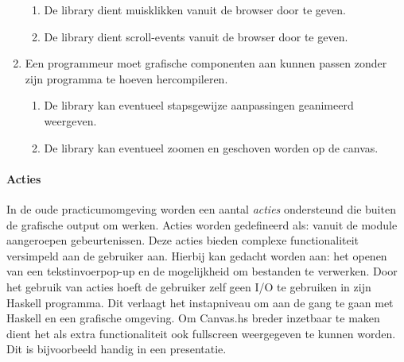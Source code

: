 \begin{enumerate}[label={R\arabic*}]
\begin{enumerate}[label={R\arabic{enumi}.\arabic*}]
		\item \label{req:event:mouse} De library dient muisklikken vanuit de browser door te geven.
		\item \label{req:event:scroll} De library dient scroll-events vanuit de browser door te geven.
	\end{enumerate}
	\item Een programmeur moet grafische componenten aan kunnen passen zonder zijn programma te hoeven hercompileren.
	\begin{enumerate}[label={R\arabic{enumi}.\arabic*}]
		\item \label{req:action:animate} De library kan eventueel stapsgewijze aanpassingen geanimeerd weergeven.
		\item \label{req:zoom} De library kan eventueel zoomen en geschoven worden op de canvas.
	\end{enumerate}
	\setcounter{startvalue}{\value{enumi}}
\end{enumerate}

\paragraph{Acties} In de oude practicumomgeving worden een aantal \emph{acties} ondersteund die buiten de grafische output om werken. Acties worden gedefineerd als: vanuit de module aangeroepen gebeurtenissen. Deze acties bieden complexe functionaliteit versimpeld aan de gebruiker aan. Hierbij kan gedacht worden aan: het openen van een tekstinvoerpop-up en de mogelijkheid om bestanden te verwerken. Door het gebruik van acties hoeft de gebruiker zelf geen I/O te gebruiken in zijn Haskell programma. Dit verlaagt het instapniveau om aan de gang te gaan met Haskell en een grafische omgeving. Om Canvas.hs breder inzetbaar te maken dient het als extra functionaliteit ook fullscreen weergegeven te kunnen worden. Dit is bijvoorbeeld handig in een presentatie.

